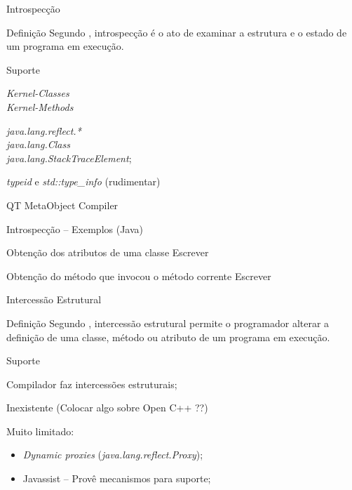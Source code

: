 \documentclass[12pt,t]{beamer}
\begin{document}
 	 \begin{frame}{Introspecção}
 	 	\begin{block}{Definição}
 	 		Segundo , introspecção é o ato de examinar a estrutura e o estado de um programa em execução.
 	 	\end{block}
 	 	\begin{block}{Suporte}
 	 		\begin{description}[Smalltalk]
 	 			\item [Smalltalk] \emph{Kernel-Classes} \\
 	 							  \emph{Kernel-Methods} \\
 	 			\item [Java] \emph{java.lang.reflect.*} \\ 
 	 			             \emph{java.lang.Class} \\ 
 	 			             \emph{java.lang.StackTraceElement};
 				\item [C++] \emph{typeid} e \emph{std::type\_info} (\alert{rudimentar}) \\
				\item QT MetaObject Compiler
 			\end{description}
 		\end{block}
 	 \end{frame}
 	 \begin{frame}{Introspecção -- Exemplos (Java)}
 	 	\begin{exampleblock}{Obtenção dos atributos de uma classe}
 	 		\alert{Escrever}
 	 	\end{exampleblock}
 	 	\begin{exampleblock}{Obtenção do método que invocou o método corrente}
 	 		\alert{Escrever}
 	 	\end{exampleblock}
 	 \end{frame}
 	 \begin{frame}{Intercessão Estrutural}
 	 	\begin{block}{Definição}
 	 		Segundo , intercessão estrutural permite o programador alterar a definição de uma classe, método ou atributo de um programa em execução.
 	 	\end{block} 	 	
 	 	\begin{block}{Suporte}
 	 		\begin{description}[Smalltalk]
 	 			\item [Smalltalk] Compilador faz intercessões estruturais;
 	 			\item [C++] Inexistente (\alert{Colocar algo sobre Open C++ ??})
 	 			\item [Java] Muito limitado:
	 	 			\begin{itemize}
	 	 				\item \emph{Dynamic proxies} (\emph{java.lang.reflect.Proxy});
	 	 				\item Javassist \cite{chiba2000load} -- Provê mecanismos para suporte; 
	 	 			\end{itemize}
 	 		\end{description}
 	 	\end{block}
 	 \end{frame}
\end{document}
